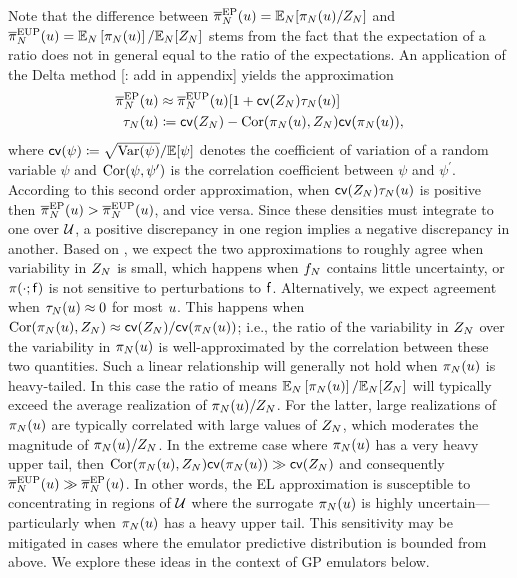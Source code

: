 \documentclass[12pt]{article}
\begin{document}
Note that the difference between $\overline{\pi}_{N}^{\mathrm{EP}}(u) = \mathbb{E}_{N}[\pi_{N}(u)/Z_{N}]$ and 
$\overline{\pi}_{N}^{\mathrm{EUP}}(u) = \mathbb{E}_{N}\left[\pi_{N}(u) \right]/\mathbb{E}_{N}[Z_{N}]$ 
stems from the fact that the expectation of a ratio does not 
in general equal to the ratio of the expectations. An application of the Delta method [\todo: add in appendix] 
yields the approximation
\begin{align}
\overline{\pi}_{N}^{\mathrm{EP}}(u)
&\approx \overline{\pi}_{N}^{\mathrm{EUP}}(u)[1 + \mathsf{cv}(Z_{N}) \tau_{N}(u)] \label{eq:delta-method} \\
\tau_{N}(u) &\coloneqq \mathsf{cv}(Z_{N}) - \mathrm{Cor}(\pi_{N}(u), Z_{N}) \mathsf{cv}(\pi_{N}(u)), \nonumber
\end{align}
where $\mathsf{cv}(\psi) \coloneqq \sqrt{\mathrm{Var}(\psi)}/\mathbb{E}[\psi]$ denotes the coefficient of variation of a random 
variable $\psi$ and $\mathrm{Cor}(\psi, \psi^\prime)$ is the correlation coefficient between $\psi$
and $\psi^\prime$. According to this second order approximation, when 
$\mathsf{cv}(Z_{N}) \tau_{N}(u)$ is positive then $\overline{\pi}_{N}^{\mathrm{EP}}(u) > \overline{\pi}_{N}^{\mathrm{EUP}}(u)$,
and vice versa. Since these densities must integrate to
one over $\mathcal{U}$, a positive discrepancy in one region implies a negative discrepancy in another.
Based on , we expect the two approximations to roughly agree when variability 
in $Z_{N}$ is small, which happens when $f_{N}$ contains little uncertainty, or 
$\pi(\cdot; \mathsf{f})$ is not sensitive to perturbations to $\mathsf{f}$. Alternatively, we expect 
agreement when $\tau_{N}(u) \approx 0$ for most $u$. This happens when
$\mathrm{Cor}(\pi_{N}(u), Z_{N}) \approx \mathsf{cv}(Z_{N}) / \mathsf{cv}(\pi_{N}(u))$; i.e., the ratio of the 
variability in $Z_{N}$ over the variability in $\pi_{N}(u)$ is well-approximated by the 
correlation between these two quantities. Such a linear relationship will generally not hold when 
$\pi_{N}(u)$ is heavy-tailed. In this case the ratio of means
$\mathbb{E}_{N}\left[\pi_{N}(u) \right]/\mathbb{E}_{N}[Z_{N}]$ will typically exceed the average
realization of $\pi_{N}(u)/Z_{N}$. For the latter, large realizations of $\pi_{N}(u)$
are typically correlated with large values of $Z_{N}$, which moderates the magnitude of 
$\pi_{N}(u)/Z_{N}$. In the extreme case where $\pi_{N}(u)$ has a very heavy 
upper tail, then $\mathrm{Cor}(\pi_{N}(u), Z_{N}) \mathsf{cv}(\pi_{N}(u)) \gg \mathsf{cv}(Z_{N})$ and
consequently $\overline{\pi}_{N}^{\mathrm{EUP}}(u) \gg \overline{\pi}_{N}^{\mathrm{EP}}(u)$. In other words, the 
EL approximation is susceptible to concentrating in regions of $\mathcal{U}$ where the 
surrogate $\pi_{N}(u)$ is highly uncertain---particularly when $\pi_{N}(u)$ has a 
heavy upper tail. This sensitivity may be mitigated in cases where the emulator predictive
distribution is bounded from above. We explore these ideas in the context of GP emulators 
below. 
\end{document}

